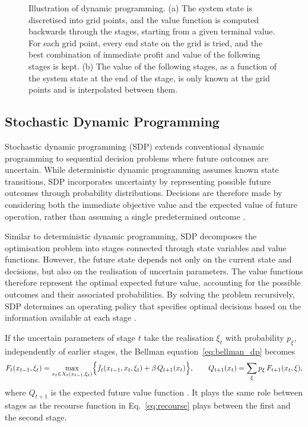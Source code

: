 \begin{figure}[H]
{\begin{tikzpicture}
\end{tikzpicture}%
}
\caption{Illustration of dynamic programming. (a) The system state is discretised into grid points, and the value function is computed backwards through the stages, starting from a given terminal value. For each grid point, every end state on the grid is tried, and the best combination of immediate profit and value of the following stages is kept. (b) The value of the following stages, as a function of the system state at the end of the stage, is only known at the grid points and is interpolated between them.}
\label{fig:dp_basic}
\end{figure}



\subsection{Stochastic Dynamic Programming}
\label{subsec:stochastic_dynamic_programming}

Stochastic dynamic programming (SDP) extends conventional dynamic programming to sequential decision problems where future outcomes are uncertain. While deterministic dynamic programming assumes known state transitions, SDP incorporates uncertainty by representing possible future outcomes through probability distributions. Decisions are therefore made by considering both the immediate objective value and the expected value of future operation, rather than assuming a single predetermined outcome \parencite[p.~674]{yakowitz1982}.

Similar to deterministic dynamic programming, SDP decomposes the optimisation problem into stages connected through state variables and value functions. However, the future state depends not only on the current state and decisions, but also on the realisation of uncertain parameters. The value functions therefore represent the optimal expected future value, accounting for the possible outcomes and their associated probabilities. By solving the problem recursively, SDP determines an operating policy that specifies optimal decisions based on the information available at each stage \parencite{castelletti2010}. %

If the uncertain parameters of stage $t$ take the realisation $\xi_t$ with probability $p_{\xi}$, independently of earlier stages, the Bellman equation~\eqref{eq:bellman_dp} becomes
\begin{equation}
F_t(x_{t-1},\xi_t)=\max_{x_t\in X_t(x_{t-1},\xi_t)}\Bigl\{f_t(x_{t-1},x_t,\xi_t)+\beta\,Q_{t+1}(x_t)\Bigr\},
\qquad
Q_{t+1}(x_t)=\sum_{\xi}p_{\xi}\,F_{t+1}(x_t,\xi),
\label{eq:bellman_sdp}
\end{equation}
where $Q_{t+1}$ is the expected future value function \parencite[p.~66]{shapiro2011}. It plays the same role between stages as the recourse function in Eq.~\eqref{eq:recourse} plays between the first and the second stage.

